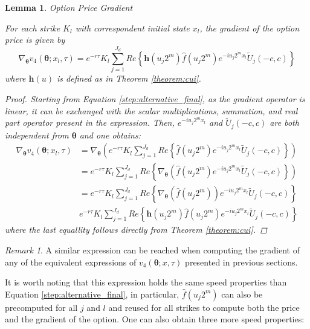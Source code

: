 \documentclass[12,twoside]{mammeTFM}
\newtheorem{lem}[thm]{Lemma}
\theoremstyle{definition}
\theoremstyle{remark}
\newtheorem{remark}[thm]{Remark}
\begin{document}
\begin{lem} Option Price Gradient

For each strike $K_l$ with correspondent initial state $x_l$, the gradient of the option price is given by
\begin{equation}
\nabla_{\boldsymbol{\theta}} v_4(\boldsymbol{\theta}; x_l, \tau) = 
e^{-r\tau} K_l \sum_{j=1}^{J_d} Re \left\{ \boldsymbol{h}(u_j 2^m) \hat{f}(u_j 2^m) e^{-i u_j 2^m x_l} \tilde{U}_j(-c,c) \right\}
\end{equation}
where $\boldsymbol{h}(u)$ is defined as in Theorem \ref{theorem:cui}.
\begin{proof}
Starting from Equation \ref{step:alternative_final}, as the gradient operator is linear, it can be exchanged with the scalar multiplications, summation, and real part operator present in the expression. Then, $e^{-i u_j 2^m x_l}$ and $\tilde{U}_j(-c,c)$ are both independent from $\boldsymbol{\theta}$ and one obtains:
\begin{equation}
\begin{aligned}
\nabla_{\boldsymbol{\theta}}v_4(\boldsymbol{\theta}; x_l, \tau) &= \nabla_{\boldsymbol{\theta}} \left(e^{-r\tau}K_l \sum_{j=1}^{J_d} Re \left\{ \hat{f}(u_j 2^m) e^{-i u_j 2^m x_l} \tilde{U}_j(-c,c) \right\} \right)\\
&= e^{-r\tau}K_l \sum_{j=1}^{J_d} Re \left\{ \nabla_{\boldsymbol{\theta}} \left(\hat{f}(u_j 2^m) e^{-i u_j 2^m x_l} \tilde{U}_j(-c,c) \right\} \right)\\
&= e^{-r\tau}K_l \sum_{j=1}^{J_d} Re \left\{ \nabla_{\boldsymbol{\theta}} \left(\hat{f}(u_j 2^m) \right) e^{-i u_j 2^m x_l} \tilde{U}_j(-c,c) \right\} \\
& e^{-r\tau} K_l \sum_{j=1}^{J_d} Re \left\{ \boldsymbol{h}(u_j 2^m) \hat{f}(u_j 2^m) e^{-i u_j 2^m x_l} \tilde{U}_j(-c,c) \right\}
\end{aligned}
\end{equation}
where the last equallity follows directly from Theorem \ref{theorem:cui}.
\end{proof}
\end{lem}

\begin{remark}
A similar expression can be reached when computing the gradient of any of the equivalent expressions of $v_4(\boldsymbol{\theta}; x, \tau)$ presented in previous sections. 
\end{remark}

It is worth noting that this expression holds the same speed properties than Equation \ref{step:alternative_final}, in particular, $\hat{f}(u_j 2^m)$ can also be precomputed for all $j$ and $l$ and reused for all strikes to compute both the price and the gradient of the option. One can also obtain three more speed properties:
\end{document}
